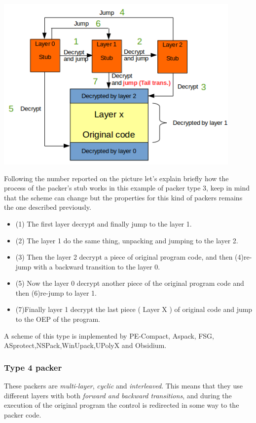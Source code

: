 \includegraphics[width=0.9\textwidth]{pictures/packer_type_3.png} 

Following the number reported on the picture let's explain briefly how the process of the packer's stub works in this example of packer type 3, keep in mind that the scheme can change but the properties for this kind of packers remains the one described previously.

\begin{itemize}
\item (1) The first layer decrypt and finally jump to the layer 1.
\item (2) The layer 1 do the same thing, unpacking and jumping to the layer 2.
\item (3) Then the layer 2 decrypt a piece of original program code, and then (4)re-jump with a backward transition to the layer 0.
\item (5) Now the layer 0 decrypt another piece of the original program code and then (6)re-jump to layer 1.
\item (7)Finally layer 1 decrypt the last piece ( Layer X ) of original code and jump to the OEP of the program.
\end{itemize}

A scheme of this type is implemented by PE-Compact, Aspack, FSG, ASprotect,NSPack,WinUpack,UPolyX and Obsidium.

\subsubsection{Type 4 packer}

These packers are \textit{multi-layer}, \textit{cyclic} and \textit{interleaved}. This means that they use different layers with both \textit{forward and backward transitions}, and during the execution of the original program the control is redirected in some way to the packer code.

